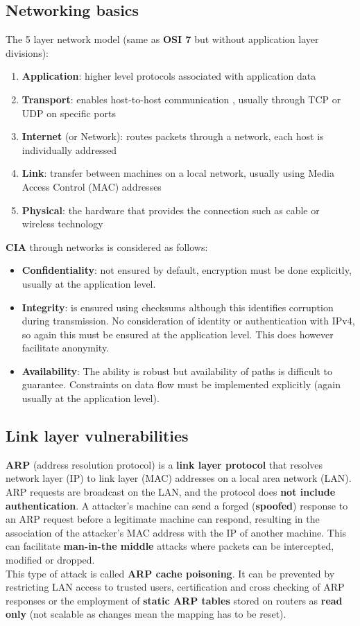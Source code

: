 \documentclass[final]{article}
\newcommand{\np}{\vspace{8pt} \\}
\begin{document}
\subsection{Networking basics}
The 5 layer network model (same as \textbf{OSI 7} but without application layer divisions):
\begin{enumerate}
	\item \textbf{Application}: higher level protocols associated with application data
	\item \textbf{Transport}: enables host-to-host communication , usually through TCP or UDP on specific ports
	\item \textbf{Internet} (or Network): routes packets through a network, each host is individually addressed
	\item \textbf{Link}: transfer between machines on a local network, usually using Media Access Control (MAC) addresses
	\item \textbf{Physical}: the hardware that provides the connection such as cable or wireless technology
\end{enumerate}
\textbf{CIA} through networks is considered as follows:
\begin{itemize}
	\item \textbf{Confidentiality}: not ensured by default, encryption must be done explicitly, usually at the application level.
	\item \textbf{Integrity}: is ensured using checksums although this identifies corruption during transmission. No consideration of identity or authentication with IPv4, so again this must be ensured at the application level. This does however facilitate anonymity.
	\item \textbf{Availability}: The ability is robust but availability of paths is difficult to guarantee. Constraints on data flow must be implemented explicitly (again usually at the application level).
\end{itemize}

\subsection{Link layer vulnerabilities}
\textbf{ARP} (address resolution protocol) is a \textbf{link layer protocol} that resolves network layer (IP) to link layer (MAC) addresses on a local area network (LAN). ARP requests are broadcast on the LAN, and the protocol does \textbf{not include authentication}. A attacker's machine can send a forged (\textbf{spoofed}) response to an ARP request before a legitimate machine can respond, resulting in the association of the attacker's MAC address with the IP of another machine. This can facilitate \textbf{man-in-the middle} attacks where packets can be intercepted, modified or dropped. \np
This type of attack is called \textbf{ARP cache poisoning}. It can be prevented by restricting LAN access to trusted users, certification and cross checking of ARP responses or the employment of \textbf{static ARP tables} stored on routers as \textbf{read only} (not scalable as changes mean the mapping has to be reset).
\end{document}
